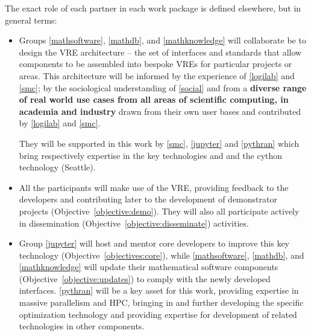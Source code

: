 \documentclass[noworkareas,deliverables,keys]{euproposal}                  %
\begin{document}
\begin{proposal}

The exact role of each partner in each work package is defined
elsewhere, but in general terms:
\begin{itemize}
\item Groups \ref{mathsoftware}, \ref{mathdb}, and
\ref{mathknowledge} will collaborate be to design the \TheProject VRE
architecture -- the set of interfaces and standards that allow
components to be assembled into bespoke VREs for particular projects
or areas. This architecture will be informed  by the
experience of \ref{logilab} and \ref{smc}; by the sociological
understanding of \ref{social} and from a 
\textbf{diverse range of real world use cases from all areas of scientific
  computing, in academia and industry} drawn from their own user bases
and contributed by \ref{logilab} and \ref{smc}.

They will be supported in this work by \ref{smc}, \ref{jupyter} and \ref{pythran} which
bring respectively expertise in the key technologies \SMC and \Jupyter and the cython
technology (Seattle).

\item All the participants will make use of the \TheProject VRE, providing feedback to the
  developers and contributing later to the development of demonstrator projects
  (Objective~\ref{objective:demo}). They will also all participate actively in
  dissemination (Objective~\ref{objective:disseminate}) activities.

\item Group \ref{jupyter} will host and mentor core \Jupyter developers to improve this
  key technology (Objective~\ref{objectives:core}), while \ref{mathsoftware},
  \ref{mathdb}, and \ref{mathknowledge} will update their mathematical software components
  (Objective~\ref{objective:updates}) to comply with the newly developed
  interfaces. \ref{pythran} will be a key asset for this work, providing expertise in
  massive parallelism and HPC, bringing in and further developing the specific \Pythran
  optimization technology and providing expertise for development of related technologies
  in other components.  


\end{itemize}
\end{proposal}
\end{document}
